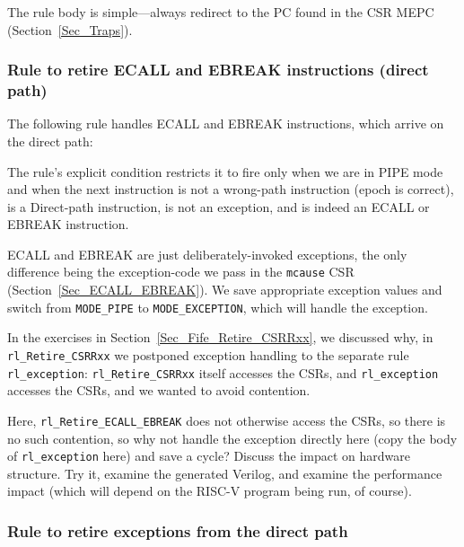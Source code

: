 The rule body is simple---always redirect to the PC found in the CSR
MEPC (Section~\ref{Sec_Traps}).


\subsubsection{Rule to retire ECALL and EBREAK instructions (direct path)}

The following rule handles ECALL and EBREAK instructions, which arrive on the direct path:



The rule's explicit condition restricts it to fire only when we are in
PIPE mode and when the next instruction is not a wrong-path
instruction (epoch is correct), is a Direct-path instruction, is not
an exception, and is indeed an ECALL or EBREAK instruction.

ECALL and EBREAK are just deliberately-invoked exceptions, the only
difference being the exception-code we pass in the \verb|mcause| CSR
(Section~\ref{Sec_ECALL_EBREAK}).  We save appropriate exception
values and switch from \verb|MODE_PIPE| to \verb|MODE_EXCEPTION|,
which will handle the exception.


\Exercise

In the exercises in Section~\ref{Sec_Fife_Retire_CSRRxx}, we discussed
why, in \verb|rl_Retire_CSRRxx| we postponed exception handling to the
separate rule \verb|rl_exception|: \verb|rl_Retire_CSRRxx| itself
accesses the CSRs, and \verb|rl_exception| accesses the CSRs, and we
wanted to avoid contention.

\vspace{1ex}

Here, \verb|rl_Retire_ECALL_EBREAK| does not otherwise access the
CSRs, so there is no such contention, so why not handle the exception
directly here (copy the body of \verb|rl_exception| here) and save a
cycle?  Discuss the impact on hardware structure.  Try it, examine the
generated Verilog, and examine the performance impact (which will
depend on the RISC-V program being run, of course).

\Endexercise


\subsubsection{Rule to retire exceptions from the direct path}

